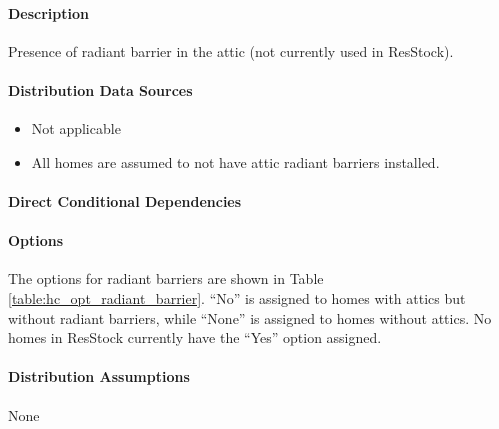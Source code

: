 \paragraph{Description}
% 
Presence of radiant barrier in the attic (not currently used in
ResStock).

\paragraph{Distribution Data Sources}
% 
\begin{itemize}

\item
  Not applicable
\item
  All homes are assumed to not have attic radiant barriers installed.
\end{itemize}

\paragraph{Direct Conditional Dependencies}


\paragraph{Options}
The options for radiant barriers are shown in Table \ref{table:hc_opt_radiant_barrier}. ``No'' is assigned to homes with attics but without radiant barriers, while ``None'' is assigned to homes without attics. No homes in ResStock currently have the ``Yes'' option assigned.



\paragraph{Distribution Assumptions}
% 
None
